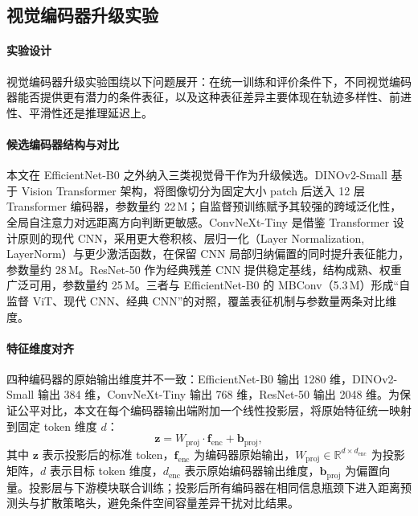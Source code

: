 \subsection{视觉编码器升级实验}

\paragraph*{实验设计}

视觉编码器升级实验围绕以下问题展开：在统一训练和评价条件下，不同视觉编码器能否提供更有潜力的条件表征，以及这种表征差异主要体现在轨迹多样性、前进性、平滑性还是推理延迟上。

\paragraph*{候选编码器结构与对比}

本文在 EfficientNet-B0 之外纳入三类视觉骨干作为升级候选。DINOv2-Small\cite{dinov2_2023} 基于 Vision Transformer 架构，将图像切分为固定大小 patch 后送入 12 层 Transformer 编码器，参数量约 22\,M；自监督预训练赋予其较强的跨域泛化性，全局自注意力对远距离方向判断更敏感。ConvNeXt-Tiny\cite{convnext2022} 是借鉴 Transformer 设计原则的现代 CNN，采用更大卷积核、层归一化（Layer Normalization, LayerNorm）与更少激活函数，在保留 CNN 局部归纳偏置的同时提升表征能力，参数量约 28\,M。ResNet-50\cite{resnet2016} 作为经典残差 CNN 提供稳定基线，结构成熟、权重广泛可用，参数量约 25\,M。三者与 EfficientNet-B0 的 MBConv（5.3\,M）形成``自监督 ViT、现代 CNN、经典 CNN''的对照，覆盖表征机制与参数量两条对比维度。

\paragraph*{特征维度对齐}

四种编码器的原始输出维度并不一致：EfficientNet-B0 输出 1280 维，DINOv2-Small 输出 384 维，ConvNeXt-Tiny 输出 768 维，ResNet-50 输出 2048 维。为保证公平对比，本文在每个编码器输出端附加一个线性投影层，将原始特征统一映射到固定 token 维度 $d$：
\begin{equation}
\mathbf{z} = W_{\text{proj}} \cdot \mathbf{f}_{\text{enc}} + \mathbf{b}_{\text{proj}},
\end{equation}
其中 $\mathbf{z}$ 表示投影后的标准 token，$\mathbf{f}_{\text{enc}}$ 为编码器原始输出，$W_{\text{proj}} \in \mathbb{R}^{d \times d_{\text{enc}}}$ 为投影矩阵，$d$ 表示目标 token 维度，$d_{\text{enc}}$ 表示原始编码器输出维度，$\mathbf{b}_{\text{proj}}$ 为偏置向量。投影层与下游模块联合训练；投影后所有编码器在相同信息瓶颈下进入距离预测头与扩散策略头，避免条件空间容量差异干扰对比结果。


